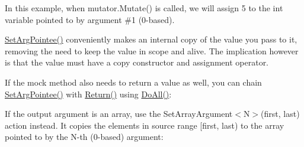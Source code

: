 \begin{DoxyCode}{0}
\DoxyCodeLine{}
\DoxyCodeLine{\};}
\DoxyCodeLine{}
\end{DoxyCode}


In this example, when {\ttfamily mutator.\+Mutate()} is called, we will assign 5 to the {\ttfamily int} variable pointed to by argument \#1 (0-\/based).

{\ttfamily \mbox{\hyperlink{namespacetesting_a6dbe77dc170c495ea300dd9d74ed4595}{Set\+Arg\+Pointee()}}} conveniently makes an internal copy of the value you pass to it, removing the need to keep the value in scope and alive. The implication however is that the value must have a copy constructor and assignment operator.

If the mock method also needs to return a value as well, you can chain {\ttfamily \mbox{\hyperlink{namespacetesting_a6dbe77dc170c495ea300dd9d74ed4595}{Set\+Arg\+Pointee()}}} with {\ttfamily \mbox{\hyperlink{namespacetesting_adae3994eb444d1ad2dd602454b854663}{Return()}}} using {\ttfamily \mbox{\hyperlink{namespacetesting_a3824c79dc6e9e05c337a675e82da2045}{Do\+All()}}}\+:


\begin{DoxyCode}{0}
\DoxyCodeLine{}
\DoxyCodeLine{\};}
\DoxyCodeLine{}
\end{DoxyCode}


If the output argument is an array, use the {\ttfamily Set\+Array\+Argument$<$N$>$(first, last)} action instead. It copies the elements in source range {\ttfamily \mbox{[}first, last)} to the array pointed to by the {\ttfamily N}-\/th (0-\/based) argument\+:


\begin{DoxyCode}{0}
\DoxyCodeLine{}
\DoxyCodeLine{\};}
\DoxyCodeLine{}
\end{DoxyCode}


